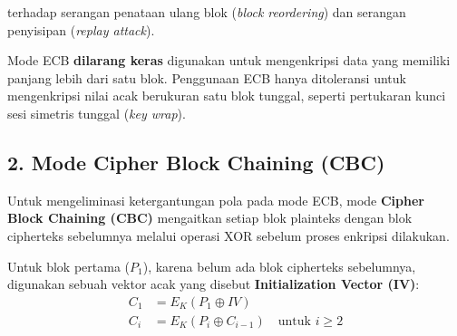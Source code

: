 \begin{table}[htbp]
  \centering
  \small
  \caption{Komparasi karakteristik komputasi dan keamanan mode operasi block cipher.}
  \label{tab:mode-komparasi}
\end{table}
 terhadap serangan penataan ulang blok (\textit{block reordering}) dan serangan penyisipan (\textit{replay attack}).

\begin{catatan}
Mode ECB \textbf{dilarang keras} digunakan untuk mengenkripsi data yang memiliki panjang lebih dari satu blok. Penggunaan ECB hanya ditoleransi untuk mengenkripsi nilai acak berukuran satu blok tunggal, seperti pertukaran kunci sesi simetris tunggal (\textit{key wrap}).
\end{catatan}

\subsection{2. Mode Cipher Block Chaining (CBC)}

Untuk mengeliminasi ketergantungan pola pada mode ECB, mode \textbf{Cipher Block Chaining (CBC)} mengaitkan setiap blok plainteks dengan blok cipherteks sebelumnya melalui operasi XOR sebelum proses enkripsi dilakukan.

Untuk blok pertama ($P_1$), karena belum ada blok cipherteks sebelumnya, digunakan sebuah vektor acak yang disebut \textbf{Initialization Vector (IV)}:
\begin{align}
  C_1 &= E_K(P_1 \oplus IV) \\
  C_i &= E_K(P_i \oplus C_{i-1}) \quad \text{untuk } i \ge 2
\end{align}

